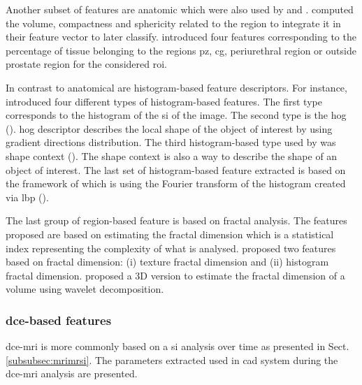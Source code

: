 \begin{enumerate}[leftmargin=*]
  Another subset of features are anatomic which were also used by \cite{Litjens2012,Litjens2014} and \cite{Matulewicz2013}. \cite{Litjens2012,Litjens2014} computed the volume, compactness and sphericity related to the region to integrate it in their feature vector to later classify. \cite{Matulewicz2013} introduced four features corresponding to the percentage of tissue belonging to the regions \ac{pz}, \ac{cg}, periurethral region or outside prostate region for the considered \ac{roi}.

  In contrast to anatomical are histogram-based feature descriptors. For instance, \cite{Liu2013} introduced four different types of histogram-based features. The first type corresponds to the histogram of the \ac{si} of the image. The second type is the \acf{hog} (\cite{Dalal2005}). \Ac{hog} descriptor describes the local shape of the object of interest by using gradient directions distribution. The third histogram-based type used by \cite{Liu2013} was shape context (\cite{Belongie2002}). The shape context is also a way to describe the shape of an object of interest. The last set of histogram-based feature extracted is based on the framework of \cite{Zhao2012} which is using the Fourier transform of the histogram created via \acf{lbp} (\cite{Ojala1996}).

  The last group of region-based feature is based on fractal analysis. The features proposed are based on estimating the fractal dimension which is a statistical index representing the complexity of what is analysed. \cite{Lv2009} proposed two features based on fractal dimension: (i) texture fractal dimension and (ii) histogram fractal dimension. \cite{Lopes2011} proposed a 3D version to estimate the fractal dimension of a volume using wavelet decomposition.
\end{enumerate}

\subsubsection{\ac{dce}-based features}\label{subsubsec:fddce}

\ac{dce}-\ac{mri} is more commonly based on a \ac{si} analysis over time as presented in Sect. \ref{subsubsec:mrimrsi}. The parameters extracted used in \ac{cad} system during the \ac{dce}-\ac{mri} analysis are presented.

